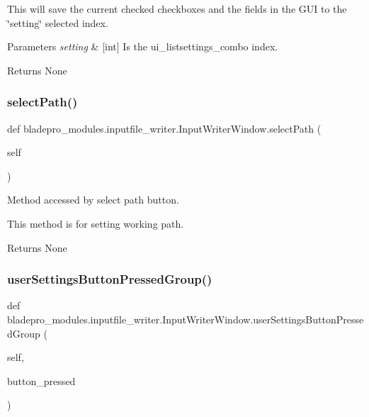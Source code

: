 This will save the current checked checkboxes and the fields in the G\+UI to the \char`\"{}setting\char`\"{} selected index.


\begin{DoxyParams}{Parameters}
{\em setting} & \mbox{[}int\mbox{]} Is the ui\+\_\+listsettings\+\_\+combo index. \\
\hline
\end{DoxyParams}
\begin{DoxyReturn}{Returns}
None 
\end{DoxyReturn}
\hypertarget{a00070_a15eb2b878a78d644c96b19a5785d5428}{}\label{a00070_a15eb2b878a78d644c96b19a5785d5428} 
\subsubsection{\texorpdfstring{select\+Path()}{selectPath()}}
{\footnotesize\ttfamily def bladepro\+\_\+modules.\+inputfile\+\_\+writer.\+Input\+Writer\+Window.\+select\+Path (\begin{DoxyParamCaption}\item[{}]{self }\end{DoxyParamCaption})}



Method accessed by select path button. 

This method is for setting working path.

\begin{DoxyReturn}{Returns}
None 
\end{DoxyReturn}
\hypertarget{a00070_a1b508dd4cb9c699a1769e7727d1e6fc1}{}\label{a00070_a1b508dd4cb9c699a1769e7727d1e6fc1} 
\subsubsection{\texorpdfstring{user\+Settings\+Button\+Pressed\+Group()}{userSettingsButtonPressedGroup()}}
{\footnotesize\ttfamily def bladepro\+\_\+modules.\+inputfile\+\_\+writer.\+Input\+Writer\+Window.\+user\+Settings\+Button\+Pressed\+Group (\begin{DoxyParamCaption}\item[{}]{self,  }\item[{}]{button\+\_\+pressed }\end{DoxyParamCaption})}



